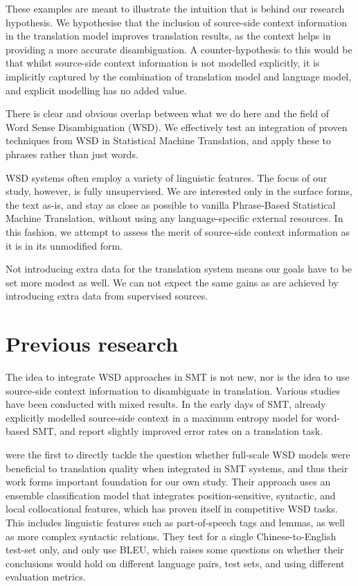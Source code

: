 \documentclass[11pt]{article}
\begin{document}
These examples are meant to illustrate the intuition that is behind our
research hypothesis. We hypothesise that the inclusion of source-side context
information in the translation model improves translation results, as the
context helps in providing a more accurate disambiguation. A counter-hypothesis
to this would be that whilst source-side context information is not modelled
explicitly, it is implicitly captured by the combination of translation model
and language model, and explicit modelling has no added value.

There is clear and obvious overlap between what we do here and the field of
Word Sense Disambiguation (WSD). We effectively test an integration of proven
techniques from WSD in Statistical Machine Translation, and apply these to
phrases rather than just words.

WSD systems often employ a variety of linguistic features. The focus of our
study, however, is fully unsupervised. We are interested only in the surface
forms, the text as-is, and stay as close as possible to vanilla Phrase-Based
Statistical Machine Translation, without using any language-specific external
resources. In this fashion, we attempt to assess the merit of source-side
context information as it is in its unmodified form. 

Not introducing extra data for the translation system means our goals have to
be set more modest as well. We can not expect the same gains as are achieved by
introducing extra data from supervised sources.

\section{Previous research}

The idea to integrate WSD approaches in SMT is not new, nor is the idea to use
source-side context information to disambiguate in translation. Various studies
have been conducted with mixed results. In the early days of SMT,
\cite{GarciaVarea+02} already explicitly modelled source-side context in a
maximum entropy model for word-based SMT, and report slightly improved error
rates on a translation task.

\cite{CarpuatWu05} were the first to directly tackle the question whether
full-scale WSD models were beneficial to translation quality when integrated in
SMT systems, and thus their work forms important foundation for our own study.
Their approach uses an ensemble classification model that integrates
position-sensitive, syntactic, and local collocational features, which has
proven itself in competitive WSD tasks. This includes linguistic features such
as part-of-speech tags and lemmas, as well as more complex syntactic relations.
They test for a single Chinese-to-English test-set only, and only use BLEU,
which raises some questions on whether their conclusions would hold on
different language pairs, test sets, and using different evaluation metrics.
\end{document}
